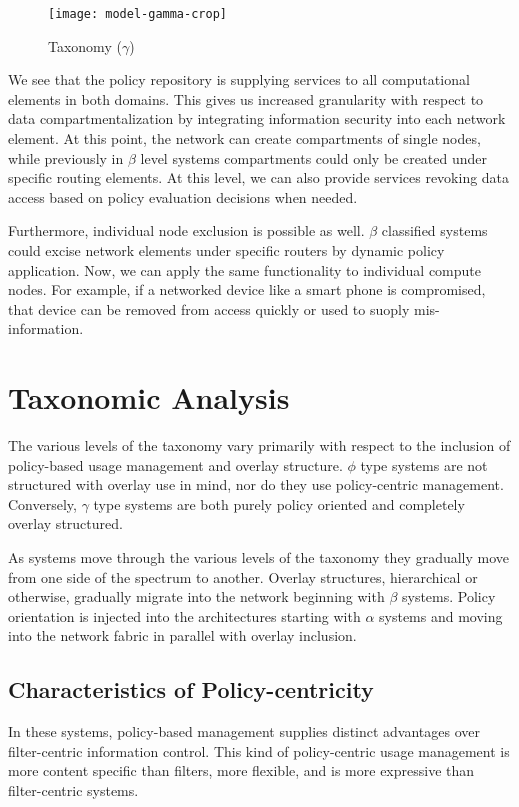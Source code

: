\begin{figure}[!t]
\centering
\texttt{[image: model-gamma-crop]}
\caption{Taxonomy ($\gamma$)}
\label{fig:model:taxonomy-gamma}
\end{figure}

We see that the policy repository is supplying services to all computational elements in both domains.  This gives us increased granularity with respect to data compartmentalization by integrating information security into each network element.  At this point, the network can create compartments of single nodes, while previously in $\beta$ level systems compartments could only be created under specific routing elements.  At this level, we can also provide services revoking data access based on policy evaluation decisions when needed.

Furthermore, individual node exclusion is possible as well. $\beta$ classified systems could excise network elements under specific routers by dynamic policy application.  Now, we can apply the same functionality to individual compute nodes.  For example, if a networked device like a smart phone is compromised, that device can be removed from access quickly or used to suoply mis-information.

\section{Taxonomic Analysis}
The various levels of the taxonomy vary primarily with respect to the inclusion of policy-based usage management and overlay structure.  $\phi$ type systems are not structured with overlay use in mind, nor do they use policy-centric management.  Conversely, $\gamma$ type systems are both purely policy oriented and completely overlay structured.

As systems move through the various levels of the taxonomy they gradually move from one side of the spectrum to another.  Overlay structures, hierarchical or otherwise, gradually migrate into the network beginning with $\beta$ systems.  Policy orientation is injected into the architectures starting with $\alpha$ systems and moving into the network fabric in parallel with overlay inclusion.

\subsection{Characteristics of Policy-centricity}
In these systems, policy-based management supplies distinct advantages over filter-centric information control.  This kind of policy-centric usage management is more content specific than filters, more flexible, and is more expressive than filter-centric systems.

